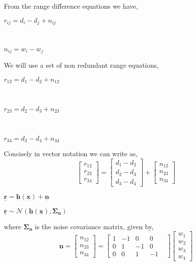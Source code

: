\documentclass[a4 paper]{article}
\begin{document}
\setlength{\abovedisplayskip}{3pt}
\setlength{\belowdisplayskip}{3pt}


\solution From the range difference equations we have,
\\ \centerline{$ r_{ij} = d_{i} - d_{j} + n_{ij} $}
\\ \centerline{$ n_{ij} = w_{i} - w_{j} $}

We will use a set of non redundant range equations,
\\ \centerline{$ r_{12} = d_{1} - d_{2} + n_{12} $}
\\ \centerline{$ r_{23} = d_{2} - d_{3} + n_{23} $}
\\ \centerline{$ r_{34} = d_{3} - d_{4} + n_{34} $}

Concisely in vector notation we can write as,
\[
\begin{bmatrix}
r_{12} \\ r_{23} \\ r_{34}
\end{bmatrix}
=
\begin{bmatrix}
d_{1} - d_{2} \\ d_{2}-d_{3} \\ d_{3}-d_{4}
\end{bmatrix}
+
\begin{bmatrix}
n_{12} \\ n_{23} \\ n_{34}
\end{bmatrix}
\]

\centerline{$ \mathbf{\underline{r}} = \mathbf{\underline{h}(\mathbf{\underline{x}})} + \mathbf{\underline{n}} $}
\centerline{$ \mathbf{\underline{r}} \sim \mathcal{N}(\mathbf{\underline{h}(\mathbf{\underline{x}})}, \mathbf{\Sigma_{n}})$}
where $\mathbf{\Sigma_{n}}$ is the noise covariance matrix, given by,
\[
\mathbf{\underline{n}} = 
\begin{bmatrix}
n_{12} \\ n_{23} \\ n_{34}
\end{bmatrix}
=
\begin{bmatrix}
1 & -1 & 0 & 0 \\ 0 & 1 & -1 & 0 \\ 0 & 0& 1 & -1 & 
\end{bmatrix}
\begin{bmatrix}
w_{1} \\ w_{2} \\ w_{3} \\ w_{4}
\end{bmatrix}
\]
\end{document}
